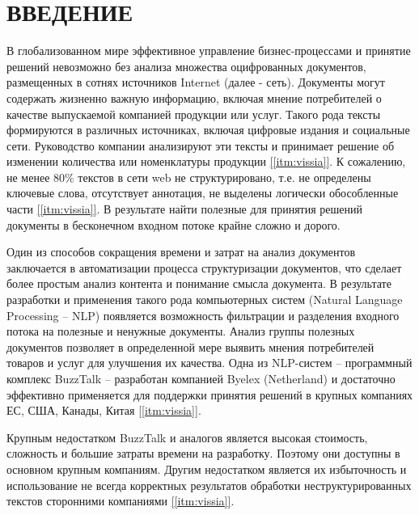 \chapter*{ВВЕДЕНИЕ}

В глобализованном мире эффективное управление бизнес-процессами и принятие решений невозможно без анализа множества оцифрованных документов, размещенных в сотнях источников Internet (далее - сеть). Документы могут содержать жизненно важную информацию, включая мнение потребителей о качестве выпускаемой компанией продукции или услуг. Такого рода тексты формируются в различных источниках, включая цифровые издания и социальные сети. Руководство компании анализируют эти тексты и принимает решение об изменении количества или номенклатуры продукции \hyperref[itm:vissia]{[\ref{itm:vissia}]}.
К сожалению, не менее $80\%$ текстов в сети web не структурировано, т.е. не определены ключевые слова, отсутствует аннотация, не выделены логически обособленные части \hyperref[itm:vissia]{[\ref{itm:vissia}]}. В результате найти полезные для принятия решений документы в бесконечном входном потоке крайне сложно и дорого.

Один из способов сокращения времени и затрат на анализ документов заключается в автоматизации процесса структуризации документов, что сделает более простым анализ контента и понимание смысла документа. В результате разработки и применения такого рода компьютерных систем (Natural Language Processing -- NLP) появляется возможность фильтрации и разделения входного потока на полезные и ненужные документы. Анализ группы полезных документов позволяет в определенной мере выявить мнения потребителей товаров и услуг для улучшения их качества. Одна из NLP-систем -- программный комплекс BuzzTalk -- разработан компанией Byelex (Netherland) и достаточно эффективно применяется для поддержки принятия решений в крупных компаниях ЕС, США, Канады, Китая \hyperref[itm:vissia]{[\ref{itm:vissia}]}.

Крупным недостатком BuzzTalk и аналогов является высокая стоимость, сложность и большие затраты времени на разработку. Поэтому они доступны в основном крупным компаниям. Другим недостатком является их избыточность и  использование не всегда корректных результатов обработки неструктурированных текстов сторонними компаниями \hyperref[itm:vissia]{[\ref{itm:vissia}]}.  

